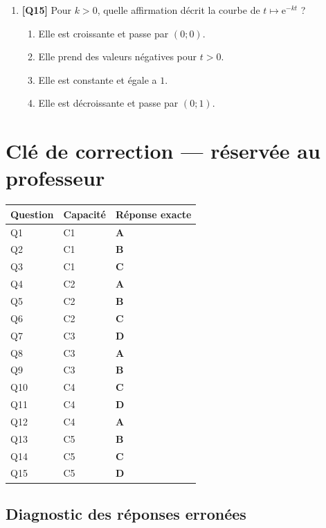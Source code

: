 \begin{enumerate}
\item \textbf{[Q15]} Pour $k>0$, quelle affirmation décrit la courbe de $t\mapsto\mathrm{e}^{-kt}$ ?
  \begin{enumerate}[label=\Alph*.]
    \item Elle est croissante et passe par $(0;0)$.
    \item Elle prend des valeurs négatives pour $t>0$.
    \item Elle est constante et égale a $1$.
    \item Elle est décroissante et passe par $(0;1)$.
  \end{enumerate}

\end{enumerate}

\ifnxVersionProfesseur
\clearpage
\section*{Clé de correction — réservée au professeur}

\begin{center}
\begin{tabular}{lll}
\hline
Question & Capacité & Réponse exacte \\
\hline
Q1 & C1 & \textbf{A} \\
Q2 & C1 & \textbf{B} \\
Q3 & C1 & \textbf{C} \\
Q4 & C2 & \textbf{A} \\
Q5 & C2 & \textbf{B} \\
Q6 & C2 & \textbf{C} \\
Q7 & C3 & \textbf{D} \\
Q8 & C3 & \textbf{A} \\
Q9 & C3 & \textbf{B} \\
Q10 & C4 & \textbf{C} \\
Q11 & C4 & \textbf{D} \\
Q12 & C4 & \textbf{A} \\
Q13 & C5 & \textbf{B} \\
Q14 & C5 & \textbf{C} \\
Q15 & C5 & \textbf{D} \\
\hline
\end{tabular}
\end{center}

\subsection*{Diagnostic des réponses erronées}

